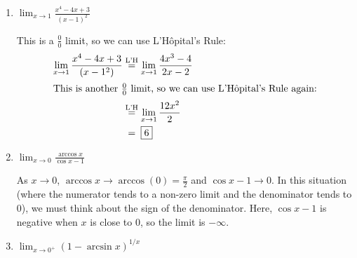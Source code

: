 \documentclass{article}
\begin{document}
\begin{enumerate}
  \begin{enumerate}
  \item \label{fall2012-1a-midterm2-5a}

    \begin{problem}[\vfill]
      $\displaystyle \lim_{x \rightarrow 1} \frac{x^4 - 4x + 3}{(x -
        1)^2}$
    \end{problem}

    \begin{solution}
      This is a $\frac{0}{0}$ limit, so we can use L'H\^opital's Rule:
      \begin{align*}
        \lim_{x \to 1} \frac{x^4 - 4x +3}{(x-1^2)} 
        & \lheq \lim_{x \to 1} \frac{4 x^3 - 4}{2x-2} \\
        \intertext{This is another $\frac{0}{0}$ limit, so we can use
          L'H\^opital's Rule again:}
        & \lheq \lim_{x \to 1} \frac{12 x^2}{2} \\
        & \nolheq \boxed{6}
      \end{align*}
    \end{solution}

  \item
    \begin{problem}[\vfill]
      $\displaystyle \lim_{x \rightarrow 0} \frac{\arccos x}{\cos x - 1}$
    \end{problem}

    \begin{solution}
      As $x \to 0$, $\arccos x \to \arccos (0) = \frac{\pi}{2}$ and
      $\cos x - 1 \to 0$.  In this situation (where the numerator tends
      to a non-zero limit and the denominator tends to 0), we must think
      about the sign of the denominator.  Here, $\cos x - 1$ is negative
      when $x$ is close to 0, so the limit is $\boxed{-\infty}$. 
    \end{solution}

  \item

    \begin{problem}[\vfill]
      $\displaystyle \lim_{x \to 0^+} (1 - \arcsin x)^{1/x}$
    \end{problem}


\end{enumerate}
\end{enumerate}
\end{document}
